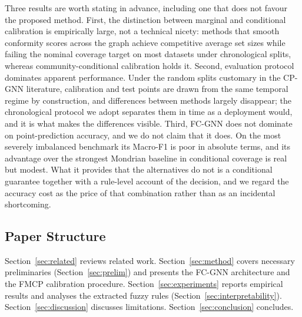 Three results are worth stating in advance, including one that does not favour
the proposed method.
First, the distinction between marginal and conditional calibration is
empirically large, not a technical nicety: methods that smooth conformity scores
across the graph achieve competitive average set sizes while failing the nominal
coverage target on most datasets under chronological splits, whereas
community-conditional calibration holds it.
Second, evaluation protocol dominates apparent performance. Under the random
splits customary in the CP-GNN literature, calibration and test points are drawn
from the same temporal regime by construction, and differences between methods
largely disappear; the chronological protocol we adopt separates them in time as
a deployment would, and it is what makes the differences visible.
Third, FC-GNN does not dominate on point-prediction accuracy, and we do not
claim that it does. On the most severely imbalanced benchmark its Macro-F1 is
poor in absolute terms, and its advantage over the strongest Mondrian baseline
in conditional coverage is real but modest. What it provides that the
alternatives do not is a conditional guarantee together with a rule-level
account of the decision, and we regard the accuracy cost as the price of that
combination rather than as an incidental shortcoming.

\subsection{Paper Structure}

Section~\ref{sec:related} reviews related work.
Section~\ref{sec:method} covers necessary preliminaries
(Section~\ref{sec:prelim}) and presents the FC-GNN architecture and the
FMCP calibration procedure.
Section~\ref{sec:experiments} reports empirical results and analyses the
extracted fuzzy rules (Section~\ref{sec:interpretability}).
Section~\ref{sec:discussion} discusses limitations.
Section~\ref{sec:conclusion} concludes.
